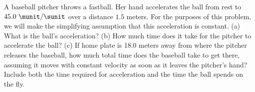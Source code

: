 %
A baseball pitcher throws a fastball. Her hand accelerates the ball from
rest to $45.0\ \munit/\sunit$ over a distance $1.5$ meters. For the purposes
of this problem, we will make the simplifying assumption that this acceleration
is constant.
%
(a) What is the ball's acceleration?\answercheck\hwendpart
%
(b) How much time does it take for the pitcher to accelerate the
ball?\answercheck\hwendpart
%
(c) If home plate is 18.0 meters away from where the pitcher releases
the baseball, how much total time does the baseball take to get there, assuming
it moves with constant velocity as soon as it leaves the pitcher's
hand? Include both the time required for acceleration and the time the ball
spends on the fly.\answercheck
